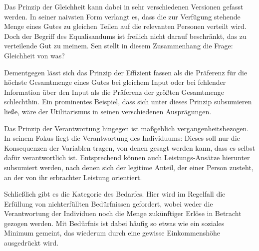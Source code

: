 \documentclass[a4paper]{thesis}
\begin{document}
Das Prinzip der Gleichheit kann dabei in sehr verschiedenen Versionen gefasst werden. In seiner naivsten Form verlangt es, dass die zur Verfügung stehende Menge eines Gutes zu gleichen Teilen auf die relevanten Personen verteilt wird. Doch der Begriff des Equalisandums ist freilich nicht darauf beschränkt, das zu verteilende Gut zu meinem. Sen stellt in diesem Zusammenhang die Frage: Gleichheit von was?

Dementgegen lässt sich das Prinzip der Effizient fassen als die Präferenz für die höchste Gesamtmenge eines Gutes bei gleichem Input oder bei fehlender Information über den Input als die Präferenz der größten Gesamtmenge schlechthin. Ein prominentes Beispiel, dass sich unter dieses Prinzip subsumieren ließe, wäre der Utilitarismus in seinen verschiedenen Ausprägungen.

Das Prinzip der Verantwortung hingegen ist maßgeblich vergangenheitsbezogen. In seinem Fokus liegt die Verantwortung des Individuums: Dieses soll nur die Konsequenzen der Variablen tragen, von denen gesagt werden kann, dass es selbst dafür verantwortlich ist. Entsprechend können auch Leistungs-Ansätze hierunter subsumiert werden, nach denen sich der legitime Anteil, der einer Person zusteht, an der von ihr erbrachter Leistung orientiert.

Schließlich gibt es die Kategorie des Bedarfes. Hier wird im Regelfall die Erfüllung von nichterfüllten Bedürfnissen gefordert, wobei weder die Verantwortung der Individuen noch die Menge zukünftiger Erlöse in Betracht gezogen werden. Mit Bedürfnis ist dabei häufig so etwas wie ein soziales Minimum gemeint, das wiederum durch eine gewisse Einkommenshöhe ausgedrückt wird.
\end{document}
